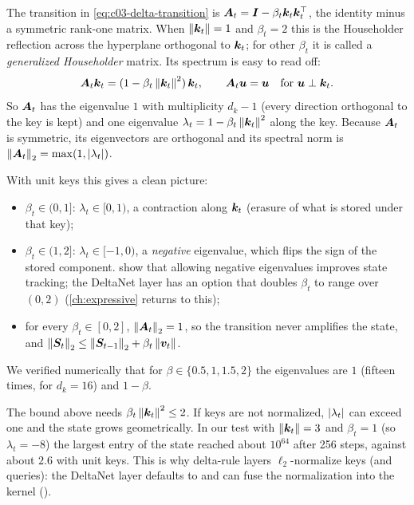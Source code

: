 The transition in \cref{eq:c03-delta-transition} is $\bm{A}_t=\bm{I}-\beta_t\bm{k}_t\bm{k}_t^{\top}$, the
identity minus a symmetric rank-one matrix. When $\left\lVert \bm{k}_t\right\rVert=1$ and $\beta_t=2$ this is the
Householder reflection across the hyperplane orthogonal to $\bm{k}_t$; for other $\beta_t$ it is
called a \emph{generalized Householder} matrix. Its spectrum is easy to read off:
\[
  \bm{A}_t\bm{k}_t=(1-\beta_t\left\lVert \bm{k}_t\right\rVert^2)\,\bm{k}_t,\qquad \bm{A}_t\bm{u}=\bm{u}\quad\text{for }\bm{u}\perp\bm{k}_t .
\]
So $\bm{A}_t$ has the eigenvalue $1$ with multiplicity $d_k-1$ (every direction orthogonal to the
key is kept) and one eigenvalue $\lambda_t=1-\beta_t\left\lVert \bm{k}_t\right\rVert^2$ along the key. Because
$\bm{A}_t$ is symmetric, its eigenvectors are orthogonal and its spectral norm is
$\left\lVert \bm{A}_t\right\rVert_2=\max(1,\left\lvert \lambda_t\right\rvert)$.

With unit keys this gives a clean picture:
\begin{itemize}
\item $\beta_t\in(0,1]$: $\lambda_t\in[0,1)$, a contraction along $\bm{k}_t$ (erasure of what is
stored under that key);
\item $\beta_t\in(1,2]$: $\lambda_t\in[-1,0)$, a \emph{negative} eigenvalue, which flips the sign
of the stored component. \citet{c03-grazzi2025unlocking} show that allowing negative eigenvalues
improves state tracking; the \fla{} DeltaNet layer has an option  that
doubles $\beta_t$ to range over $(0,2)$ (\cref{ch:expressive} returns to this);
\item for every $\beta_t\in[0,2]$, $\left\lVert \bm{A}_t\right\rVert_2=1$, so the transition never amplifies the
state, and $\left\lVert \bm{S}_t\right\rVert_2\le\left\lVert \bm{S}_{t-1}\right\rVert_2+\beta_t\left\lVert \bm{v}_t\right\rVert$.
\end{itemize}
We verified numerically that for $\beta\in\{0.5,1,1.5,2\}$ the eigenvalues are $1$ (fifteen
times, for $d_k=16$) and $1-\beta$.

\begin{pitfall}[title={Pitfall: unnormalized keys}]
The bound above needs $\beta_t\left\lVert \bm{k}_t\right\rVert^2\le2$. If keys are not normalized,
$\left\lvert \lambda_t\right\rvert$ can exceed one and the state grows geometrically. In our test with
$\left\lVert \bm{k}_t\right\rVert=3$ and $\beta_t=1$ (so $\lambda_t=-8$) the largest entry of the state reached
about $10^{64}$ after 256 steps, against about $2.6$ with unit keys. This is why delta-rule layers
$\ell_2$-normalize keys (and queries): the \fla{} DeltaNet layer defaults to
 and can fuse the normalization into the kernel
().
\end{pitfall}

